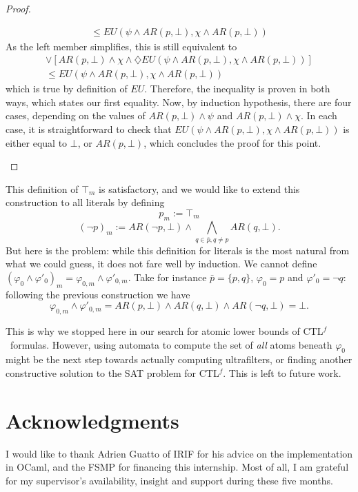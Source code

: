 \documentclass[11pt]{article}
\newcommand{\CTLf}{{CTL$^f$}}
\newcommand{\phii}{{\varphi}}
\newcommand{\dia}{{\diamondsuit}}
\newcommand{\ARp}{{AR (p,\bot)}}
\theoremstyle{definition}
\begin{document}
\begin{proof}
\begin{itemize}
\begin{multline*}
                \leq EU(\psi\wedge\ARp,\chi\wedge\ARp)
            \end{multline*}
            As the left member simplifies, this is still equivalent to 
            \begin{multline*}
                [\ARp\wedge\psi]\vee[\ARp\wedge\chi\wedge\dia EU(\psi\wedge\ARp,\chi\wedge\ARp)]\\
                \leq EU(\psi\wedge\ARp,\chi\wedge\ARp)
            \end{multline*}
            which is true by definition of $EU$. Therefore, the inequality is proven in both ways, which states our first equality.
            Now, by induction hypothesis, there are four cases, depending on the values of $AR(p,\bot)\wedge\psi$ and $AR(p,\bot)\wedge\chi$. In each case, it is straightforward to check that $EU(\psi\wedge AR(p,\bot),\chi\wedge AR(p,\bot))$ is either equal to $\bot$, or $AR(p,\bot)$, which concludes the proof for this point.
    \end{itemize}
\end{proof}


This definition of $\top_m$ is satisfactory, and we would like to extend this construction to all literals by defining
 \[p_m:=\top_m\] \[(\neg p)_m:=AR(\neg p,\bot)\wedge\bigwedge_{q\in\bar{p},q\not=p}AR(q,\bot).\] But here is the problem: 
 while this definition for literals is the most natural from what we could guess, it does not fare well by induction. 
 We cannot define $(\varphi_0\wedge\varphi'_0)_m=\varphi_{0,m}\wedge\varphi'_{0,m}$. 
 Take for instance $\bar{p}=\{p,q\}$, $\varphi_0=p$ and $\varphi'_0=\neg q$: following the previous construction we have 
 \[\varphi_{0,m}\wedge\varphi'_{0,m}=AR(p,\bot)\wedge AR(q,\bot)\wedge AR(\neg q,\bot)=\bot.\]

This is why we stopped here in our search for atomic lower bounds of \CTLf~formulas. However, using automata to compute
the set of \emph{all} atoms beneath $\phii_0$ might be the next step towards actually computing ultrafilters, or finding another
constructive solution to the SAT problem for \CTLf. This is left to future work.


\section*{Acknowledgments}
    I would like to thank Adrien Guatto of IRIF for his advice on the implementation in OCaml, and the FSMP for
    financing this internship. Most of all, I am grateful for my supervisor's availability, insight and support 
    during these five months.

\end{document}
